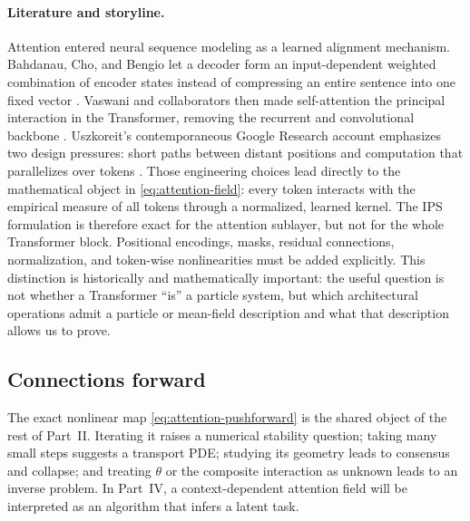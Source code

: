 \documentclass[11pt]{amsart}
\numberwithin{equation}{section}
\theoremstyle{plain}
\begin{document}
\paragraph{\textbf{Literature and storyline.}}
Attention entered neural sequence modeling as a learned alignment mechanism.
Bahdanau, Cho, and Bengio let a decoder form an input-dependent weighted
combination of encoder states instead of compressing an entire sentence into
one fixed vector \cite{BahdanauEtAl2015}.  Vaswani and collaborators then made
self-attention the principal interaction in the Transformer, removing the
recurrent and convolutional backbone \cite{VaswaniEtAl2017}.  Uszkoreit's
contemporaneous Google Research account emphasizes two design pressures:
short paths between distant positions and computation that parallelizes over
tokens \cite{UszkoreitGoogle2017}.  Those engineering choices lead directly to
the mathematical object in \eqref{eq:attention-field}: every token interacts
with the empirical measure of all tokens through a normalized, learned
kernel.  The IPS formulation is therefore exact for the attention sublayer,
but not for the whole Transformer block.  Positional encodings, masks,
residual connections, normalization, and token-wise nonlinearities must be
added explicitly.  This distinction is historically and mathematically
important: the useful question is not whether a Transformer ``is'' a particle
system, but which architectural operations admit a particle or mean-field
description and what that description allows us to prove.

\subsection{Connections forward}
The exact nonlinear map \eqref{eq:attention-pushforward} is the shared object of
the rest of Part~II.  Iterating it raises a numerical stability question;
taking many small steps suggests a transport PDE; studying its geometry leads
to consensus and collapse; and treating $\theta$ or the composite interaction
as unknown leads to an inverse problem.  In Part~IV, a context-dependent
attention field will be interpreted as an algorithm that infers a latent task.
\end{document}
